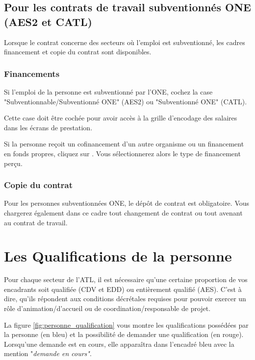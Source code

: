 
\subsection{Pour les contrats de travail subventionnés ONE (AES2 et CATL)}\label{ct_travail_aes2}
Lorsque le contrat concerne des secteurs où l'emploi est subventionné, les cadres financement et copie du contrat sont disponibles. 

\subsubsection{Financements}

Si l'emploi de la personne est subventionné par l'ONE, cochez la case "Subventionnable/Subventionné ONE" (AES2) ou "Subventionné ONE" (CATL).

Cette case doit être cochée pour avoir accès à la grille d'encodage des salaires dans les écrans de prestation.

Si la personne reçoit un cofinancement d'un autre organisme ou un financement en fonds propres, cliquez sur . Vous sélectionnerez alors le type de financement perçu. 

\subsubsection{Copie du contrat}\label{copie_contrat_aes2}
Pour les personnes subventionnées ONE, le dépôt de contrat est obligatoire. Vous chargerez également dans ce cadre tout changement de contrat ou tout avenant au contrat de travail. 




\section{Les Qualifications de la personne}\label{sec:qualif_person}
Pour chaque secteur de l'ATL, il est nécessaire qu'une certaine proportion de vos encadrants soit qualifiée (CDV et EDD) ou entièrement qualifié (AES). C'est à dire, qu'ils répondent aux conditions décrétales requises pour pouvoir exercer un rôle d'animation/d'accueil ou de coordination/responsable de projet.

La figure \ref{fig:personne_qualification} vous montre les qualifications possédées par la personne (en \textcolor{bleu}{bleu}) et la possibilité de demander une qualification (en \textcolor{rouge}{rouge}). Lorsqu'une demande est en cours, elle apparaîtra dans l'encadré \textcolor{bleu}{bleu} avec la mention "\textit{demande en cours"}. 

